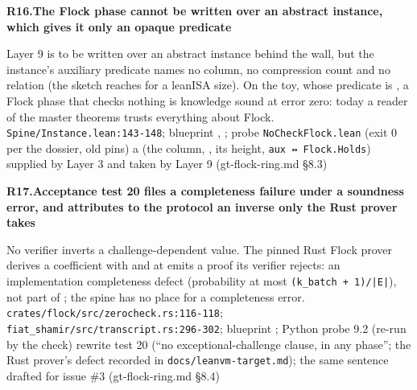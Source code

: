 \par\medskip\noindent\textbf{R16.}\enspace\textbf{The Flock phase cannot be written over an abstract instance, which gives it only an opaque predicate}\par\nopagebreak
{} Layer 9 is to be written over an abstract instance behind the wall, but the instance's auxiliary predicate names no column, no compression count and no relation (the sketch reaches for a leanISA size). On the toy, whose predicate is , a Flock phase that checks nothing is knowledge sound at error zero: today a reader of the master theorems trusts everything about Flock.
 \texttt{Spine/\allowbreak{}Instance.\allowbreak{}lean:\allowbreak{}143-\allowbreak{}148}; blueprint , ; probe \texttt{No\allowbreak{}Check\allowbreak{}Flock.\allowbreak{}lean} (exit 0 per the dossier, old pins)
 a  (the column, , its height, \texttt{aux ↔ Flock.\allowbreak{}Holds}) supplied by Layer 3 and taken by Layer 9 (gt-flock-ring.md §8.3)

\par\medskip\noindent\textbf{R17.}\enspace\textbf{Acceptance test 20 files a completeness failure under a soundness error, and attributes to the protocol an inverse only the Rust prover takes}\par\nopagebreak
{} No verifier inverts a challenge-dependent value. The pinned Rust Flock prover derives a coefficient with  and at  emits a proof its verifier rejects: an implementation completeness defect (probability at most \texttt{(\allowbreak{}k\_\allowbreak{}batch + 1)/\allowbreak{}|\allowbreak{}E|\allowbreak{}}), not part of ; the spine has no place for a completeness error.
 \texttt{crates/\allowbreak{}flock/\allowbreak{}src/\allowbreak{}zerocheck.\allowbreak{}rs:\allowbreak{}116-\allowbreak{}118}; \texttt{fiat\_\allowbreak{}shamir/\allowbreak{}src/\allowbreak{}transcript.\allowbreak{}rs:\allowbreak{}296-\allowbreak{}302}; blueprint ; Python probe 9.2 (re-run by the check)
 rewrite test 20 (``no exceptional-challenge clause, in any phase''; the Rust prover's defect recorded in \texttt{docs/\allowbreak{}leanvm-\allowbreak{}target.\allowbreak{}md}); the same sentence drafted for issue \#3 (gt-flock-ring.md §8.4)

